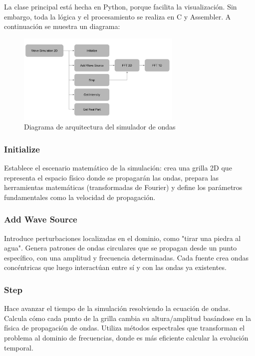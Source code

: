 \documentclass[a4paper]{article}
\begin{document}
La clase principal está hecha en Python, porque facilita la visualización. Sin embargo, toda la lógica y el procesamiento se realiza en C y Assembler. A continuación se muestra un diagrama:

\begin{figure}[h]
    \centering
    \includegraphics[width=0.7\textwidth]{extra/diagram.png}
    \caption{Diagrama de arquitectura del simulador de ondas}
    \label{fig:wave_sim_architecture}
\end{figure}

\subsubsection{Initialize} Establece el escenario matemático de la simulación: crea una grilla 2D que representa el espacio físico donde se propagarán las ondas, prepara las herramientas matemáticas (transformadas de Fourier) y define los parámetros fundamentales como la velocidad de propagación.

\subsubsection{Add Wave Source} Introduce perturbaciones localizadas en el dominio, como "tirar una piedra al agua". Genera patrones de ondas circulares que se propagan desde un punto específico, con una amplitud y frecuencia determinadas. Cada fuente crea ondas concéntricas que luego interactúan entre sí y con las ondas ya existentes.

\subsubsection{Step} Hace avanzar el tiempo de la simulación resolviendo la ecuación de ondas. Calcula cómo cada punto de la grilla cambia su altura/amplitud basándose en la física de propagación de ondas. Utiliza métodos espectrales que transforman el problema al dominio de frecuencias, donde es más eficiente calcular la evolución temporal.
\end{document}
